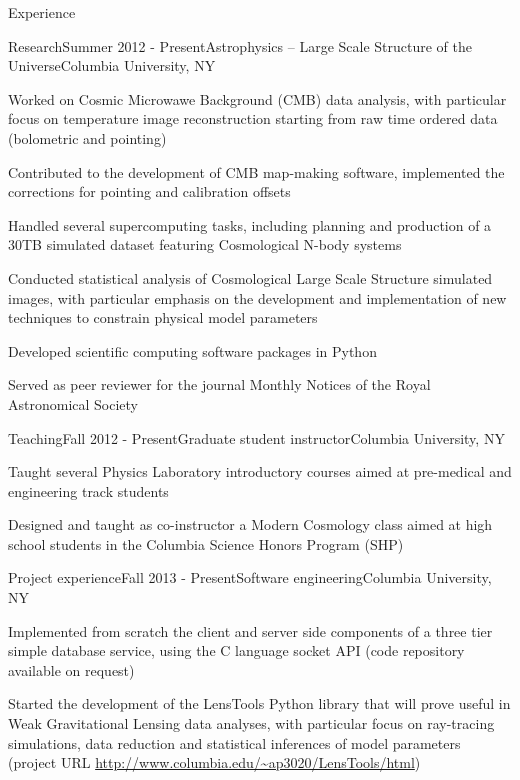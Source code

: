 \documentclass{resume} %
\begin{document}
\begin{rSection}{Experience}

\begin{rSubsection}{Research}{Summer 2012 - Present}{Astrophysics -- Large Scale Structure of the Universe}{Columbia University, NY}
\item Worked on Cosmic Microwawe Background (CMB) data analysis, with particular focus on temperature image reconstruction starting from raw time ordered data (bolometric and pointing) 
\item Contributed to the development of CMB map-making software, implemented the corrections for pointing and calibration offsets
\item Handled several supercomputing tasks, including planning and production of a 30TB simulated dataset featuring Cosmological N-body systems
\item Conducted statistical analysis of Cosmological Large Scale Structure simulated images, with particular emphasis on the development and implementation of new techniques to constrain physical model parameters
\item Developed scientific computing software packages in Python
\item Served as peer reviewer for the journal Monthly Notices of the Royal Astronomical Society
\end{rSubsection}


\begin{rSubsection}{Teaching}{Fall 2012 - Present}{Graduate student instructor}{Columbia University, NY}
\item Taught several Physics Laboratory introductory courses aimed at pre-medical and engineering track students
\item Designed and taught as co-instructor a Modern Cosmology class aimed at high school students in the Columbia Science Honors Program (SHP)   
\end{rSubsection}

\begin{rSubsection}{Project experience}{Fall 2013 - Present}{Software engineering}{Columbia University, NY}
\item Implemented from scratch the client and server side components of a three tier simple database service, using the C language socket API (code repository available on request)
\item Started the development of the LensTools Python library that will prove useful in Weak Gravitational Lensing data analyses, with particular focus on ray-tracing simulations, data reduction and statistical inferences of model parameters (project URL \url{http://www.columbia.edu/~ap3020/LensTools/html})
\end{rSubsection}

\end{rSection}
\end{document}

